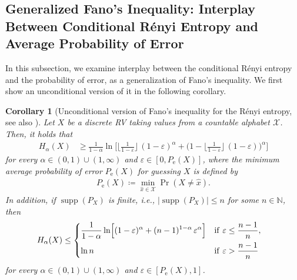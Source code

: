 \documentclass[conference, draftcls, onecolumn]{IEEEtran}
\theoremstyle{plain}
\newtheorem{corollary}{Corollary}
\newcommand{\supp}{\operatorname{supp}}
\begin{document}
\subsection{Generalized Fano's Inequality: Interplay Between Conditional R\'{e}nyi Entropy and Average Probability of Error}
\label{sect:fano}



In this subsection, we examine interplay between the conditional R\'{e}nyi entropy and the probability of error, as a generalization of Fano's inequality.
We first show an unconditional version of it in the following corollary.


\begin{corollary}[{Unconditional version of Fano's inequality for the R\'{e}nyi entropy, see also \cite[Corollary~3 and Theorem~2]{sason}}]
\label{cor:unconditional_fano_renyi}
Let $X$ be a discrete RV taking values from a countable alphabet $\mathcal{X}$.
Then, it holds that
\begin{align}
H_{\alpha}( X )
& \ge
\frac{ 1 }{ 1 - \alpha } \ln \! \Bigg[ \bigg\lfloor \frac{ 1 }{ 1 - \varepsilon } \bigg\rfloor \, (1 - \varepsilon)^{\alpha} + \bigg( 1 - \bigg\lfloor \frac{ 1 }{ 1 - \varepsilon } \bigg\rfloor \, (1 - \varepsilon) \bigg)^{\alpha} \Bigg]
\label{ineq:reverse_fano_renyi}
\end{align}
for every $\alpha \in (0, 1) \cup (1, \infty)$ and $\varepsilon \in [0, P_{\mathrm{e}}(X)]$, where the minimum average probability of error $P_{\mathrm{e}}(X)$ for guessing $X$ is defined by
\begin{align}
P_{\mathrm{e}}(X)
\coloneqq
\min_{\hat{x} \in \mathcal{X}} \Pr(X \neq \hat{x}) .
\end{align}
In addition, if $\supp( P_{X} )$ is finite, i.e., $| \! \supp( P_{X} )| \le n$ for some $n \in \mathbb{N}$, then
\begin{align}
H_{\alpha}( X )
& \le
\begin{dcases}
\frac{ 1  }{ 1 - \alpha } \ln \! \Big[ (1 - \varepsilon)^{\alpha} + (n-1)^{1-\alpha} \, \varepsilon^{\alpha} \Big]
& \mathrm{if} \ \varepsilon \le \frac{ n - 1 }{ n } ,
\\
\ln n
& \mathrm{if} \ \varepsilon > \frac{ n - 1 }{ n }
\end{dcases}
\label{ineq:fano_renyi}
\end{align}
for every $\alpha \in (0, 1) \cup (1, \infty)$ and $\varepsilon \in [P_{\mathrm{e}}( X ), 1]$.
\end{corollary}
\end{document}
